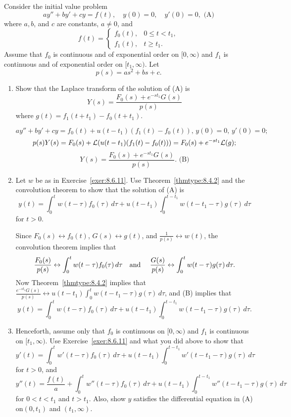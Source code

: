 \documentclass{ximera}
\begin{document}
\begin{problem}\label{exer:8.6.12}
Consider the initial value problem
$$
ay''+by'+cy=f(t),\quad y(0)=0,\quad y'(0)=0,
\text{ (A)}
$$
where $a,b$, and $c$ are constants, $a\ne0$, and
$$
f(t)=\left\{\begin{array}{cc}f_0(t),&0\le t<t_1,\\
f_1(t),&t\ge t_1.\end{array}\right.
$$
Assume that $f_0$ is continuous and of exponential order on $[0,\infty)$
and $f_1$ is continuous and of exponential order on $[t_1,\infty)$.
Let
$$
p(s)=as^2+bs+c.
$$
\begin{enumerate}
\item %
Show that the Laplace transform of the solution of  (A)
is
$$
Y(s)=\frac{F_0(s)+e^{-st_1}G(s)}{p(s)}
$$
where  $g(t)=f_1(t+t_1)-f_0(t+t_1)$.

\begin{solution}
$$
ay''+by'+cy=f_0(t)+u(t-t_1)(f_1(t)-f_0(t)),\,y(0)=0,\,y'(0)=0;
$$
$$
p(s)Y(s)=F_0(s)+{\cal L}(u(t-t_1)(f_1(t)-f_0(t)))
=F_0(s)+e^{-st_1}{\cal L}(g);
$$
$$
Y(s)=\frac{F_0(s)+e^{-st_1}G(s)}{p(s)}.
\text{ (B)}
$$
\end{solution}

\item %
Let $w$ be as in Exercise~\ref{exer:8.6.11}.
Use Theorem~\ref{thmtype:8.4.2} and the convolution theorem
to show that the solution of (A) is
$$
y(t)=\int_0^t
w(t-\tau)f_0(\tau)\,d\tau+u(t-t_1)\int_0^{t-t_1}
w(t-t_1-\tau)g(\tau)\,d\tau
$$
for $t>0$.

\begin{solution}
Since $F_0(s)\leftrightarrow f_0(t)$, $G(s)\leftrightarrow
g(t)$, and $\frac{1}{p(s)}\leftrightarrow w(t)$, the convolution
theorem implies that
$$
\frac{F_0(s)}{p(s)}\leftrightarrow
\int_0^tw(t-\tau)f_0(\tau)\,d\tau\mbox{\quad and \quad}
 \frac{G(s)}{p(s)}\leftrightarrow
\int_0^tw(t-\tau)g(\tau)\,d\tau.
$$
 Now Theorem~\ref{thmtype:8.4.2} implies that
 $\frac{e^{-st_1}G(s)}{p(s)}\leftrightarrow
u(t-t_1)\int_0^tw(t-t_1-\tau)g(\tau)\,d\tau$, and (B) implies
that
$$
y(t)=\int_0^t
w(t-\tau)f_0(\tau)\,d\tau+u(t-t_1)\int_0^{t-t_1}
w(t-t_1-\tau)g(\tau)\,d\tau.
$$
\end{solution}

\item %
Henceforth, assume only that $f_0$ is continuous on $[0,\infty)$ and $f_1$
 is continuous on $[t_1,\infty)$.
 Use  Exercise~\ref{exer:8.6.11} and what you did above to show that
$$
y'(t)=\int_0^t
w'(t-\tau)f_0(\tau)\,d\tau+u(t-t_1)\int_0^{t-t_1}
w'(t-t_1-\tau)g(\tau)\,d\tau
$$
for $t>0$, and
$$
y''(t)=\frac{f(t)}{a}+\int_0^t
w''(t-\tau)f_0(\tau)\,d\tau+u(t-t_1)\int_0^{t-t_1}
w''(t-t_1-\tau)g(\tau)\,d\tau
$$
for $0<t<t_1$ and $t>t_1$. Also, show
 $y$ satisfies the differential equation in
(A) on$(0,t_1)$ and $(t_1,\infty)$.


\end{enumerate}
\end{problem}
\end{document}
